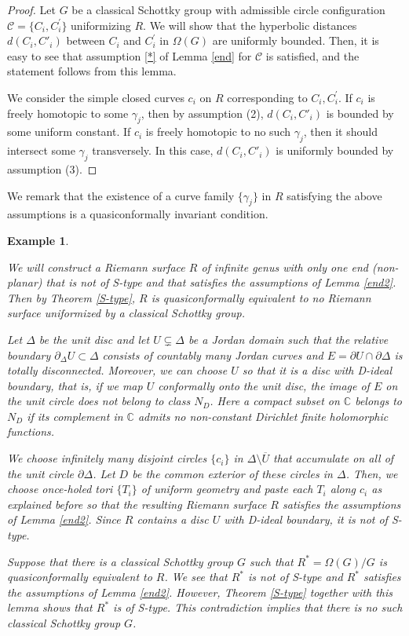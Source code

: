 \documentclass[12pt]{amsart}
\theoremstyle{plain}
\newtheorem{exam}[thm]{Example}
\begin{document}
\begin{proof}
Let $G$ be a classical Schottky group with admissible circle configuration $\mathcal{C}=\{C_i ,C_i^{\prime}\}$
uniformizing $R$. We will show that the hyperbolic distances $d(C_i, C'_i)$ between $C_i$ and $C_i^{\prime}$ in $\Omega(G)$
are uniformly bounded. Then, it is easy to see that assumption \eqref{*} of Lemma \ref{end} for $\mathcal{C}$ is satisfied,
and the statement follows from this lemma.

We consider the simple closed curves $c_i$ on $R$ corresponding to $C_i ,C_i^{\prime}$.
If $c_i$ is freely homotopic to some $\gamma_j$, then by assumption (2),
$d(C_i, C'_i)$ is bounded by some uniform constant.
If $c_i$ is freely homotopic to no such $\gamma_j$, then it should intersect some $\gamma_j$ transversely.
In this case, $d(C_i, C'_i)$ is uniformly bounded by assumption (3).
\end{proof}

We remark that the existence of a curve family $\{\gamma_j\}$ in $R$ satisfying the above assumptions
is a quasiconformally invariant condition.

\begin{exam}\label{Ex1}{\rm
We will construct a Riemann surface $R$ of infinite genus with only one end (non-planar) that is not of S-type
and that satisfies the assumptions of Lemma \ref{end2}.
Then by Theorem \ref{S-type}, $R$ is quasiconformally equivalent to
no Riemann surface uniformized by a classical Schottky group.

Let $\Delta$ be the unit disc and let $U \subsetneq \Delta$ be a Jordan domain
such that the relative boundary $\partial_\Delta U \subset \Delta$ consists of
countably many Jordan curves and $E=\partial U \cap \partial \Delta$ is totally disconnected.
Moreover, we can choose $U$ so that
it is a disc with D-ideal boundary, that is,
if we map $U$ conformally onto the unit disc, 
the image of $E$ on the unit circle does not belong to class $N_D$.
Here a compact subset on $\mathbb C$ belongs to $N_D$ 
if its complement in $\mathbb C$ admits no non-constant Dirichlet finite holomorphic functions.

We choose infinitely many disjoint circles $\{c_i\}$ in $\Delta \setminus \overline U$ 
that accumulate on all of the unit circle $\partial \Delta$. Let $D$ be the common exterior of
these circles in $\Delta$.
Then, we choose once-holed tori $\{T_i\}$ of uniform geometry and paste each $T_i$ along $c_i$
as explained before so that the resulting Riemann surface $R$ satisfies the assumptions of Lemma \ref{end2}.
Since $R$ contains a disc $U$ with D-ideal boundary, it is not of S-type.

Suppose that there is a classical Schottky group $G$ such that $R^*=\Omega(G)/G$ is quasiconformally
equivalent to $R$. We see that $R^*$ is not of S-type and $R^*$ satisfies the assumptions of 
Lemma \ref{end2}. However, Theorem \ref{S-type} together with this lemma shows that 
$R^*$ is of S-type. This contradiction implies that there is no such classical Schottky group $G$.}
\end{exam}
\end{document}
